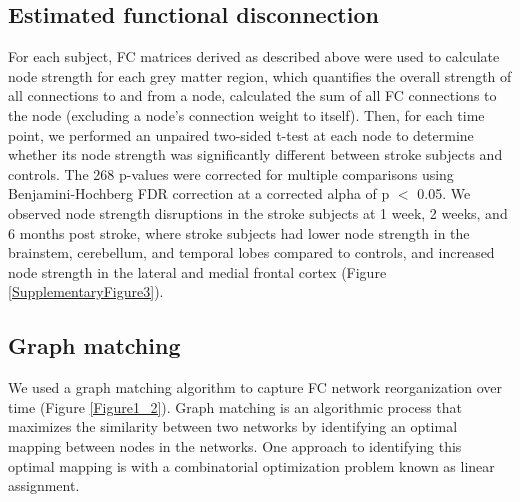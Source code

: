 \documentclass[phd,tocprelim]{cornell}
\begin{document}
	\subsection{Estimated functional disconnection}
	For each subject, FC matrices derived as described above were used to calculate node strength for each grey matter region, which quantifies the overall strength of all connections to and from a node, calculated the sum of all FC connections to the node (excluding a node's connection weight to itself). Then, for each time point, we performed an unpaired two-sided t-test at each node to determine whether its node strength was significantly different between stroke subjects and controls. The 268 p-values were corrected for multiple comparisons using Benjamini-Hochberg FDR correction at a corrected alpha of  p $<$ 0.05. We observed node strength disruptions in the stroke subjects at 1 week, 2 weeks, and 6 months post stroke, where stroke subjects had lower node strength in the brainstem, cerebellum, and temporal lobes compared to controls, and increased node strength in the lateral and medial frontal cortex (Figure \ref{SupplementaryFigure3}).
	
	\subsection{Graph matching}
	We used a graph matching algorithm to capture FC network reorganization over time (Figure \ref{Figure1_2}). Graph matching is an algorithmic process that maximizes the similarity between two networks by identifying an optimal mapping between nodes in the networks. One approach to identifying this optimal mapping is with a combinatorial optimization problem known as linear assignment. 
	
\end{document}
